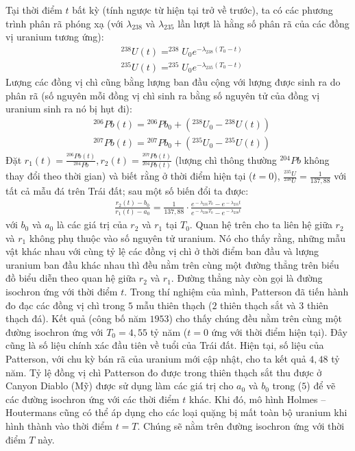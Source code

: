 \begin{multicols}{2}
	\vskip 0.1cm
	Tại thời điểm $t$ bất kỳ (tính ngược từ hiện tại trở về trước), ta có các phương trình phân rã phóng xạ (với $\lambda_{238}$ và $\lambda_{235}$ lần lượt là hằng số phân rã của các đồng vị uranium tương ứng):
	\begin{align*}
		&^{238}U(t) = ^{238}U_0e^{-\lambda_{238}(T_0 -t)} \tag{$1$}\\
		&^{235}U(t) = ^{235}U_0e^{-\lambda_{235}(T_0 -t)} \tag{$2$}
	\end{align*}
	Lượng các đồng vị chì cũng bằng lượng ban đầu cộng với lượng được sinh ra do phân rã (số nguyên mỗi đồng vị chì sinh ra bằng số nguyên tử của đồng vị uranium sinh ra nó bị hụt đi):
	\begin{align*}
		&^{206}\!Pb(t) \!=\! ^{206}\!Pb_0 \!+\! \left(^{238}\!U_0 \!-\! ^{238}\!U(t)\right) \tag{$3$}\\
		&^{207}\!Pb(t) \!=\! ^{207}\!Pb_0 \!+\! \left(^{235}\!U_0 \!-\! ^{235}\!U(t)\right) \tag{$4$}
	\end{align*}
	Đặt $r_1 (t)= \frac{^{206}Pb(t)}{^{204}Pb},r_2 (t)= \frac{^{207}Pb(t)}{^{204}Pb(t)}$ (lượng chì thông thường $^{204}Pb$ không thay đổi theo thời gian) và biết rằng ở thời điểm hiện tại ($t=0$), $\frac{^{235}U}{^{238}U} = \frac{1}{137,88}$ với tất cả mẫu đá trên Trái đất; sau một số biến đổi ta được:
	\begin{align*}
		\frac{r_2(t) \!-\! b_0}{r_1(t)\!-\! a_0} \!=\! \frac{1}{137{,}88} \!\cdot\! \frac{e^{\!-\!\lambda_{235}T_0}\!-\! e^{\!-\!\lambda_{235}t}}{e^{\!-\!\lambda_{238}T_0}\!-\! e^{\!-\!\lambda_{238}t}} \tag{$5$}
	\end{align*}
	với $b_0$ và $a_0$ là các giá trị của $r_2$ và $r_1$ tại $T_0$.
	\vskip 0.1cm
	Quan hệ trên cho ta liên hệ giữa $r_2$ và $r_1$ không phụ thuộc vào số nguyên tử uranium. Nó cho thấy rằng, những mẫu vật khác nhau với cùng tỷ lệ các đồng vị chì ở thời điểm ban đầu và lượng uranium ban đầu khác nhau thì đều nằm trên cùng một đường thẳng trên biểu đồ biểu diễn theo quan hệ giữa $r_2$ và $r_1$. Đường thẳng này còn gọi là đường isochron ứng với thời điểm $t$.
	\vskip 0.1cm
	Trong thí nghiệm của mình, Patterson đã tiến hành đo đạc các đồng vị chì trong $5$ mẫu thiên thạch ($2$ thiên thạch sắt và $3$ thiên thạch đá). Kết quả (công bố năm $1953$) cho thấy chúng đều nằm trên cùng một đường isochron ứng với $T_0=4,55$ tỷ năm ($t=0$ ứng với thời điểm hiện tại). Đây cũng là số liệu chính xác đầu tiên về tuổi của Trái đất. Hiện tại, số liệu của Patterson, với chu kỳ bán rã của uranium mới cập nhật, cho ta kết quả $4,48$ tỷ năm. Tỷ lệ đồng vị chì Patterson đo được trong thiên thạch sắt thu được ở Canyon Diablo (Mỹ) được sử dụng làm các giá trị cho $a_0$ và $b_0$ trong ($5$) để vẽ các đường isochron ứng với các thời điểm $t$ khác. Khi đó, mô hình Holmes -- Houtermans cũng có thể áp dụng cho các loại quặng bị mất toàn bộ uranium khi hình thành vào thời điểm $t=T$. Chúng sẽ nằm trên đường isochron ứng với thời điểm $T$ này.

\end{multicols}
